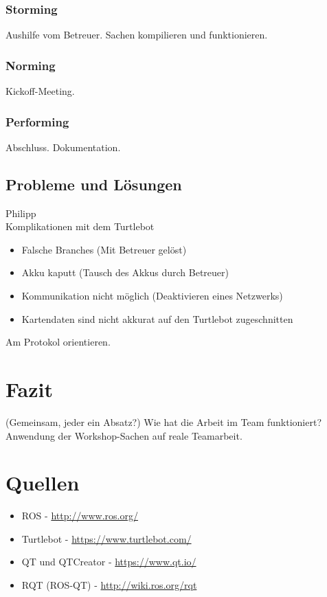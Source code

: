 \documentclass[a4paper,12pt,headsepline]{scrartcl}
\begin{document}
	\subsubsection{Storming}
		Aushilfe vom Betreuer. Sachen kompilieren und funktionieren.
	\subsubsection{Norming}
		Kickoff-Meeting. 
	\subsubsection{Performing}
		Abschluss. Dokumentation.
	\subsection{Probleme und Lösungen}
		Philipp\\
		Komplikationen mit dem Turtlebot
		\begin{itemize}
			\item Falsche Branches (Mit Betreuer gelöst)
			\item Akku kaputt (Tausch des Akkus durch Betreuer)
			\item Kommunikation nicht möglich (Deaktivieren eines Netzwerks)
			\item Kartendaten sind nicht akkurat auf den Turtlebot zugeschnitten
		\end{itemize}
		Am Protokol orientieren.
	\section{Fazit}
		(Gemeinsam, jeder ein Absatz?)
		Wie hat die Arbeit im Team funktioniert? Anwendung der Workshop-Sachen auf reale Teamarbeit.
		
	\newpage
	\section{Quellen}
		\begin{itemize}
			\item ROS - \href{http://www.ros.org/}{http://www.ros.org/}
			\item Turtlebot - \href{https://www.turtlebot.com/}{https://www.turtlebot.com/}
			\item QT und QTCreator - \href{https://www.qt.io/}{https://www.qt.io/}
			\item RQT (ROS-QT) - \href{http://wiki.ros.org/rqt}{http://wiki.ros.org/rqt}
		\end{itemize}
\end{document}
